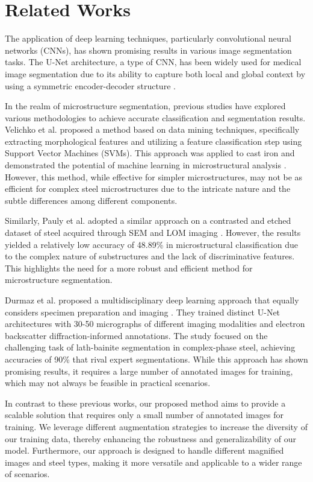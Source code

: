 \documentclass[]{article}
\begin{document}
\section{Related Works}

The application of deep learning techniques, particularly convolutional neural networks (CNNs), has shown promising results in various image segmentation tasks. The U-Net architecture, a type of CNN, has been widely used for medical image segmentation due to its ability to capture both local and global context by using a symmetric encoder-decoder structure \cite{cao2021swinunet}.

In the realm of microstructure segmentation, previous studies have explored various methodologies to achieve accurate classification and segmentation results. Velichko et al. proposed a method based on data mining techniques, specifically extracting morphological features and utilizing a feature classification step using Support Vector Machines (SVMs). This approach was applied to cast iron and demonstrated the potential of machine learning in microstructural analysis \cite{sym13071176}. However, this method, while effective for simpler microstructures, may not be as efficient for complex steel microstructures due to the intricate nature and the subtle differences among different components.

Similarly, Pauly et al. adopted a similar approach on a contrasted and etched dataset of steel acquired through SEM and LOM imaging \cite{LAI2009665}. However, the results yielded a relatively low accuracy of 48.89\% in microstructural classification due to the complex nature of substructures and the lack of discriminative features. This highlights the need for a more robust and efficient method for microstructure segmentation.

Durmaz et al. proposed a multidisciplinary deep learning approach that equally considers specimen preparation and imaging \cite{Durmaz2021}. They trained distinct U-Net architectures with 30-50 micrographs of different imaging modalities and electron backscatter diffraction-informed annotations. The study focused on the challenging task of lath-bainite segmentation in complex-phase steel, achieving accuracies of 90\% that rival expert segmentations. While this approach has shown promising results, it requires a large number of annotated images for training, which may not always be feasible in practical scenarios.

In contrast to these previous works, our proposed method aims to provide a scalable solution that requires only a small number of annotated images for training. We leverage different augmentation strategies to increase the diversity of our training data, thereby enhancing the robustness and generalizability of our model. Furthermore, our approach is designed to handle different magnified images and steel types, making it more versatile and applicable to a wider range of scenarios.
\end{document}

